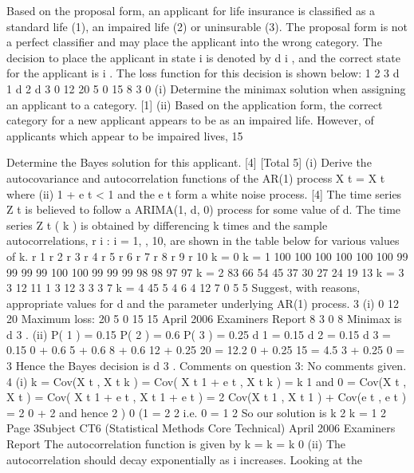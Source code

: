 \documentclass[a4paper,12pt]{article}
\begin{document}
\begin{enumerate}
Based on the proposal form, an applicant for life insurance is classified as a standard life (1), an impaired life (2) or uninsurable (3). The proposal form is not a perfect classifier and may place the applicant into the wrong category.
The decision to place the applicant in state i is denoted by d i , and the correct state for the applicant is i .
The loss function for this decision is shown below:
1
2
3
d 1 d 2 d 3
0
12
20 5
0
15 8
3
0
(i) Determine the minimax solution when assigning an applicant to a category. [1]
(ii) Based on the application form, the correct category for a new applicant appears to be as an impaired life. However, of applicants which appear to be impaired lives, 15%

Determine the Bayes solution for this applicant.
[4]
[Total 5]
(i)
Derive the autocovariance and autocorrelation functions of the AR(1) process
X t = X t
where
(ii)
1
+ e t
< 1 and the e t form a white noise process.
[4]
The time series Z t is believed to follow a ARIMA(1, d, 0) process for some value of d. The time series Z t ( k ) is obtained by differencing k times and the sample autocorrelations, {r i : i = 1, , 10}, are shown in the table below for
various values of k.
r 1
r 2
r 3
r 4
r 5
r 6
r 7
r 8
r 9
r 10
k = 0 k = 1
100%
100%
100%
100%
100%
100%
99%
99%
99%
99%
100%
100%
99%
99%
99%
98%
98%
97%
97%
k = 2
83%
66%
54%
45%
37%
30%
27%
24%
19%
13%
k = 3
3%
12%
11%
1%
3%
12%
3%
3%
3%
7%
k = 4
45%
5%
4%
6%
4%
12%
7%
0%
5%
5%
Suggest, with reasons, appropriate values for d and the parameter
underlying AR(1) process.
3
(i)
0
12
20
Maximum loss: 20
5
0
15
15
April 2006
Examiners Report
8
3
0
8
Minimax is d 3 .
(ii)
P( 1 ) = 0.15
P( 2 ) = 0.6
P( 3 ) = 0.25
d 1 = 0.15
d 2 = 0.15
d 3 = 0.15
0 + 0.6
5 + 0.6
8 + 0.6
12 + 0.25 20 = 12.2
0 + 0.25 15 = 4.5
3 + 0.25 0 = 3
Hence the Bayes decision is d 3 .
Comments on question 3: No comments given.
4
(i)
k
= Cov(X t , X t k )
= Cov( X t 1 + e t , X t k )
= k 1
and
0
= Cov(X t , X t )
= Cov( X t 1 + e t , X t 1 + e t )
= 2 Cov(X t 1 , X t 1 ) + Cov(e t , e t )
= 2 0 + 2
and hence
2 )
0 (1
=
2
2
i.e.
0 =
1
2
So our solution is
k 2
k =
1
2
Page 3Subject CT6 (Statistical Methods Core Technical)
April 2006
Examiners Report
The autocorrelation function is given by
k
=
k
=
k
0
(ii)
The autocorrelation should decay exponentially as i increases. Looking at the

\end{enumerate}
\end{document}
